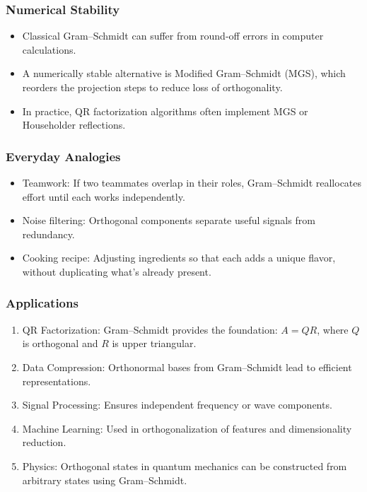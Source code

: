 \documentclass[
  letterpaper,
  DIV=11,
  numbers=noendperiod]{scrreprt}
\providecommand{\tightlist}{%
  \setlength{\itemsep}{0pt}\setlength{\parskip}{0pt}}
\begin{document}
\subsubsection{Numerical Stability}\label{numerical-stability}

\begin{itemize}
\tightlist
\item
  Classical Gram--Schmidt can suffer from round-off errors in computer
  calculations.
\item
  A numerically stable alternative is Modified Gram--Schmidt (MGS),
  which reorders the projection steps to reduce loss of orthogonality.
\item
  In practice, QR factorization algorithms often implement MGS or
  Householder reflections.
\end{itemize}

\subsubsection{Everyday Analogies}\label{everyday-analogies-69}

\begin{itemize}
\tightlist
\item
  Teamwork: If two teammates overlap in their roles, Gram--Schmidt
  reallocates effort until each works independently.
\item
  Noise filtering: Orthogonal components separate useful signals from
  redundancy.
\item
  Cooking recipe: Adjusting ingredients so that each adds a unique
  flavor, without duplicating what's already present.
\end{itemize}

\subsubsection{Applications}\label{applications-35}

\begin{enumerate}
\def\labelenumi{\arabic{enumi}.}
\tightlist
\item
  QR Factorization: Gram--Schmidt provides the foundation: \(A = QR\),
  where \(Q\) is orthogonal and \(R\) is upper triangular.
\item
  Data Compression: Orthonormal bases from Gram--Schmidt lead to
  efficient representations.
\item
  Signal Processing: Ensures independent frequency or wave components.
\item
  Machine Learning: Used in orthogonalization of features and
  dimensionality reduction.
\item
  Physics: Orthogonal states in quantum mechanics can be constructed
  from arbitrary states using Gram--Schmidt.
\end{enumerate}
\end{document}
